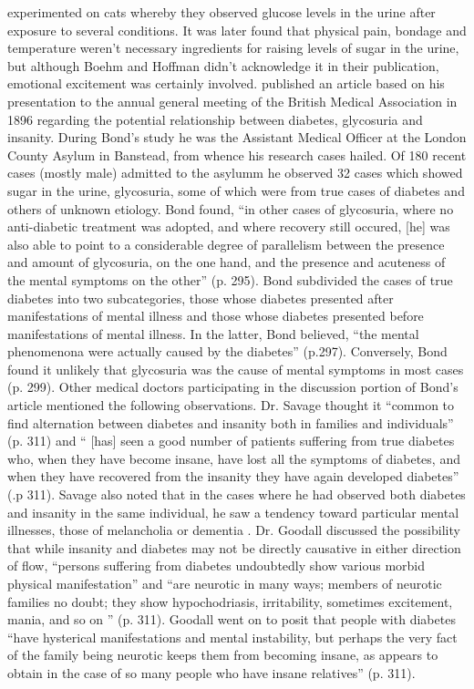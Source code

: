 \documentclass[12pt]{article}
\begin{document}
\citet{boehm_1878_beitrage} experimented on cats whereby they observed glucose levels in the urine after exposure to several conditions. It was later found that physical pain, bondage and temperature weren't necessary ingredients for raising levels of sugar in the urine, but although Boehm and Hoffman didn't acknowledge it in their publication, emotional excitement was certainly involved. 
\citet{bond_1896_relation} published an article based on his presentation to the annual general meeting of the British Medical Association in 1896 regarding the potential relationship between diabetes, glycosuria and insanity. During Bond's study he was the Assistant Medical Officer at the London County Asylum in Banstead, from whence his research cases hailed. Of 180 recent cases (mostly male) admitted to the asylumm he observed 32 cases which showed sugar in the urine, glycosuria, some of which were from true cases of diabetes and others of unknown etiology. Bond found, ``in other cases of glycosuria, where no anti-diabetic treatment was adopted, and where recovery still occured, [he] was also able to point to a considerable degree of parallelism between the presence and amount of glycosuria, on the one hand, and the presence and acuteness of the mental symptoms on the other'' (p. 295). Bond subdivided the cases of true diabetes into two subcategories, those whose diabetes presented after manifestations of mental illness and those whose diabetes presented before manifestations of mental illness. In the latter, Bond believed, ``the mental phenomenona were actually caused by the diabetes'' (p.297). Conversely, Bond found it unlikely that glycosuria was the cause of mental symptoms in most cases (p. 299). Other medical doctors participating in the discussion portion of Bond's article mentioned the following observations.
Dr. Savage thought it ``common to find alternation between diabetes and insanity both in families and individuals'' (p. 311) and `` [has] seen a good number of patients suffering from true diabetes who, when they have become insane, have lost all the symptoms of diabetes, and when they have recovered from the insanity they have again developed diabetes'' (.p 311). Savage also noted that in the cases where he had observed both diabetes and insanity in the same individual, he saw a tendency toward particular mental illnesses, those of melancholia or dementia \citep{bond_1896_relation}. 
Dr. Goodall \citep{bond_1896_relation} discussed the possibility that while insanity and diabetes may not be directly causative in either direction of flow, ``persons suffering from diabetes undoubtedly show various morbid physical manifestation'' and ``are neurotic in many ways; members of neurotic families no doubt; they show hypochodriasis, irritability, sometimes excitement, mania, and so on '' (p. 311). Goodall went on to posit that people with diabetes ``have hysterical manifestations and mental instability, but perhaps the very fact of the family being neurotic keeps them from becoming insane, as appears to obtain in the case of so many people who have insane relatives'' (p. 311). 
\end{document}
